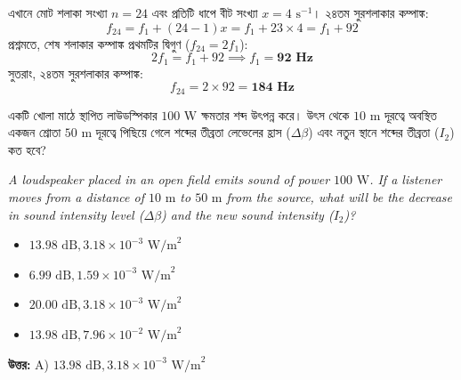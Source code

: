 \documentclass[12pt, a4paper]{article}
\begin{document}
\begin{tcolorbox}[solutionbox={সমাধান (Solution)}]
    \noindent
    এখানে মোট শলাকা সংখ্যা $n = 24$ এবং প্রতিটি ধাপে বীট সংখ্যা $x = 4\text{ s}^{-1}$। ২৪তম সুরশলাকার কম্পাঙ্ক:
    \[ f_{24} = f_1 + (24 - 1)x = f_1 + 23 \times 4 = f_1 + 92 \]
    প্রশ্নমতে, শেষ শলাকার কম্পাঙ্ক প্রথমটির দ্বিগুণ ($f_{24} = 2f_1$):
    \[ 2f_1 = f_1 + 92 \implies f_1 = \mathbf{92\text{ Hz}} \]
    সুতরাং, ২৪তম সুরশলাকার কম্পাঙ্ক:
    \[ f_{24} = 2 \times 92 = \mathbf{184\text{ Hz}} \]
\end{tcolorbox}

\vspace{2em}

\begin{tcolorbox}[questionbox={প্রশ্ন (Question) 17}]
    \noindent
    একটি খোলা মাঠে স্থাপিত লাউডস্পিকার $100\text{ W}$ ক্ষমতার শব্দ উৎপন্ন করে। উৎস থেকে $10\text{ m}$ দূরত্বে অবস্থিত একজন শ্রোতা $50\text{ m}$ দূরত্বে পিছিয়ে গেলে শব্দের তীব্রতা লেভেলের হ্রাস ($\Delta \beta$) এবং নতুন স্থানে শব্দের তীব্রতা ($I_2$) কত হবে?
    
    \vspace{0.8em}
    \begin{english}
    \noindent\textit{\color{darkgray}
    A loudspeaker placed in an open field emits sound of power $100\text{ W}$. If a listener moves from a distance of $10\text{ m}$ to $50\text{ m}$ from the source, what will be the decrease in sound intensity level ($\Delta \beta$) and the new sound intensity ($I_2$)?
    }
    \end{english}
\end{tcolorbox}

\begin{itemize}[label={}, leftmargin=1cm, itemsep=0.5em]
    \item[\textbf{A)}] $13.98\text{ dB}, 3.18 \times 10^{-3}\text{ W/m}^2$
    \item[\textbf{B)}] $6.99\text{ dB}, 1.59 \times 10^{-3}\text{ W/m}^2$
    \item[\textbf{C)}] $20.00\text{ dB}, 3.18 \times 10^{-3}\text{ W/m}^2$
    \item[\textbf{D)}] $13.98\text{ dB}, 7.96 \times 10^{-2}\text{ W/m}^2$
\end{itemize}

\vspace{0.5em}
\begin{tcolorbox}[answerbox]
    \textbf{\color{success} উত্তর:} A) $13.98\text{ dB}, 3.18 \times 10^{-3}\text{ W/m}^2$
\end{tcolorbox}
\vspace{1em}
\end{document}
